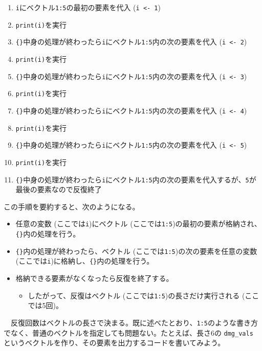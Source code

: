 \documentclass[
  a4paper,
  pandoc,
  ja=standard,
  jafont=haranoaji]{bxjsbook}
\providecommand{\tightlist}{%
  \setlength{\itemsep}{0pt}\setlength{\parskip}{0pt}}
\begin{document}
\begin{enumerate}
\def\labelenumi{\arabic{enumi}.}
\tightlist
\item
  \texttt{i}にベクトル\texttt{1:5}の最初の要素を代入
  (\texttt{i\ \textless{}-\ 1})
\item
  \texttt{print(i)}を実行
\item
  \texttt{\{\}}中身の処理が終わったら\texttt{i}にベクトル\texttt{1:5}内の次の要素を代入
  (\texttt{i\ \textless{}-\ 2})
\item
  \texttt{print(i)}を実行
\item
  \texttt{\{\}}中身の処理が終わったら\texttt{i}にベクトル\texttt{1:5}内の次の要素を代入
  (\texttt{i\ \textless{}-\ 3})
\item
  \texttt{print(i)}を実行
\item
  \texttt{\{\}}中身の処理が終わったら\texttt{i}にベクトル\texttt{1:5}内の次の要素を代入
  (\texttt{i\ \textless{}-\ 4})
\item
  \texttt{print(i)}を実行
\item
  \texttt{\{\}}中身の処理が終わったら\texttt{i}にベクトル\texttt{1:5}内の次の要素を代入
  (\texttt{i\ \textless{}-\ 5})
\item
  \texttt{print(i)}を実行
\item
  \texttt{\{\}}中身の処理が終わったら\texttt{i}にベクトル\texttt{1:5}内の次の要素を代入するが、\texttt{5}が最後の要素なので反復終了
\end{enumerate}

この手順を要約すると、次のようになる。

\begin{itemize}
\tightlist
\item
  任意の変数 (ここでは\texttt{i})にベクトル
  (ここでは\texttt{1:5})の最初の要素が格納され、\texttt{\{\}}内の処理を行う。
\item
  \texttt{\{\}}内の処理が終わったら、ベクトル
  (ここでは\texttt{1:5})の次の要素を任意の変数
  (ここでは\texttt{i})に格納し、\texttt{\{\}}内の処理を行う。
\item
  格納できる要素がなくなったら反復を終了する。

  \begin{itemize}
  \tightlist
  \item
    したがって、反復はベクトル
    (ここでは\texttt{1:5})の長さだけ実行される (ここでは5回)。
  \end{itemize}
\end{itemize}

　反復回数はベクトルの長さで決まる。既に述べたとおり、\texttt{1:5}のような書き方でなく、普通のベクトルを指定しても問題ない。たとえば、長さ6の
\texttt{dmg\_vals}
というベクトルを作り、その要素を出力するコードを書いてみよう。
\end{document}
